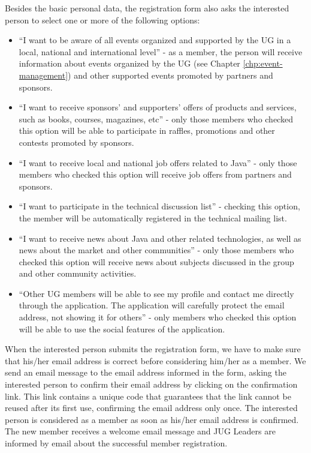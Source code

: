 \documentclass[envcountsame,envcountchap]{svmono}
\begin{document}
Besides the basic personal data, the registration form also asks the interested person to select one or more of the following options:

\begin{itemize}
\item ``I want to be aware of all events organized and supported by the UG in a local, national and international level'' - as a member, the person will receive information about events organized by the UG (see Chapter \ref{chp:event-management}) and other supported events promoted by partners and sponsors.

\item ``I want to receive sponsors' and supporters' offers of products and services, such as books, courses, magazines, etc'' - only those members who checked this option will be able to participate in raffles, promotions and other contests promoted by sponsors.

\item ``I want to receive local and national job offers related to Java'' - only those members who checked this option will receive job offers from partners and sponsors.

\item ``I want to participate in the technical discussion list'' - checking this option, the member will be automatically registered in the technical mailing list.

\item ``I want to receive news about Java and other related technologies, as well as news about the market and other communities'' - only those members who checked this option will receive news about subjects discussed in the group and other community activities.

\item ``Other UG members will be able to see my profile and contact me directly through the application. The application will carefully protect the email address, not showing it for others'' - only members who checked this option will be able to use the social features of the application.
\end{itemize}

When the interested person submits the registration form, we have to make sure that his/her email address is correct before considering him/her as a member. We send an email message to the email address informed in the form, asking the interested person to confirm their email address by clicking on the confirmation link. This link contains a unique code that guarantees that the link cannot be reused after its first use, confirming the email address only once. The interested person is considered as a member as soon as his/her email address is confirmed. The new member receives a welcome email message and JUG Leaders are informed by email about the successful member registration.
\end{document}
